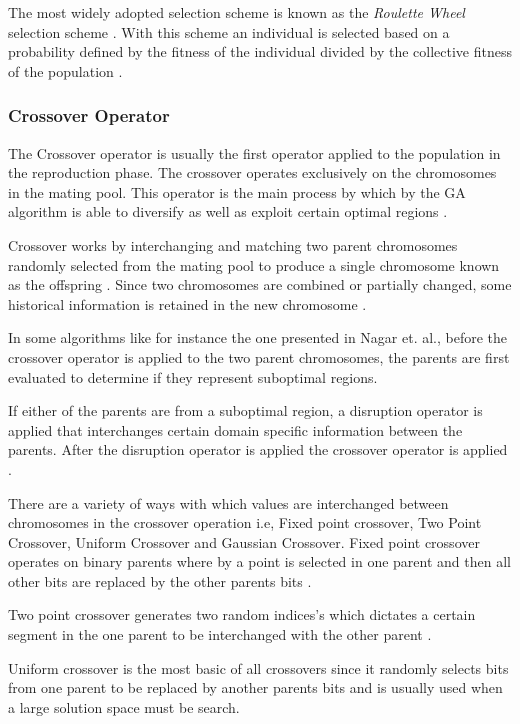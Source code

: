 The most widely adopted selection scheme is known as the \emph{Roulette Wheel} selection scheme \cite{ConstrainedGA,GeostatisticalGA,HybridBaldwinGA,CoactiveFuzzyGA}. With this scheme an individual is selected based on a probability defined by the fitness of the individual divided by the collective fitness of the population \cite{GeostatisticalGA}.
\subsubsection{Crossover Operator}
\label{sec:crossover}
The Crossover operator is usually the first operator applied to the population in the reproduction phase. The crossover operates exclusively on the chromosomes in the mating pool. This operator is the main process by which by the GA algorithm is able to diversify as well as exploit certain optimal regions \cite{CombinedBranchBoundGA,CoactiveFuzzyGA}. 

Crossover works by interchanging and matching two parent chromosomes randomly selected from the mating pool to produce a single chromosome known as the offspring \cite{FamilyGA,HumanPassiveGA,CoactiveFuzzyGA}. Since two chromosomes are combined or partially changed, some historical information is retained in the new chromosome \cite{FamilyGA}.

In some algorithms like for instance the one presented in Nagar et. al., before the crossover operator is applied to the two parent chromosomes, the parents are first evaluated to determine if they represent suboptimal regions\cite{CombinedBranchBoundGA}.

If either of the parents are from a suboptimal region, a disruption operator is applied that interchanges certain domain specific information between the parents. After the disruption operator is applied the crossover operator is applied \cite{CombinedBranchBoundGA}.

There are a variety of ways with which values are interchanged between chromosomes in the crossover operation i.e, Fixed point crossover, Two Point Crossover, Uniform Crossover and Gaussian Crossover. Fixed point crossover operates on binary parents where by a point is selected in one parent and then all other bits are replaced by the other parents bits \cite{HumanPassiveGA}. 

Two point crossover generates two random indices's which dictates a certain segment in the one parent to be interchanged with the other parent \cite{ConstrainedGA}. 

Uniform crossover is the most basic of all crossovers since it randomly selects bits from one parent to be replaced by another parents bits and is usually used when a large solution space must be search\cite{ParallelGASA,GeostatisticalGA}. 

